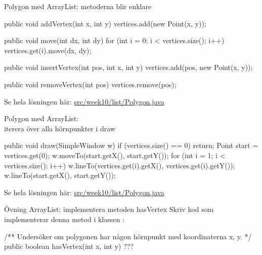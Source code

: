 \documentclass{lecturenotes}
\begin{document}
\begin{Slide}{Polygon med ArrayList: metoderna blir enklare}
\begin{Code}[numberstyle=]
    public void addVertex(int x, int y) {  
        vertices.add(new Point(x, y));
    }
    
    public void move(int dx, int dy) {
        for (int i = 0; i < vertices.size(); i++) {
        	vertices.get(i).move(dx, dy);
        }
    }
    
    public void insertVertex(int pos, int x, int y) {
    	vertices.add(pos, new Point(x, y));
    }
    
    public void removeVertex(int pos) {
    	vertices.remove(pos);
    }
\end{Code}

Se hela lösningen här:
\href{https://github.com/bjornregnell/lth-eda016-2015/blob/master/lectures/examples/eclipse-ws/lecture-examples/src/week10/list/Polygon.java}{src/week10/list/Polygon.java}
\end{Slide}

\begin{Slide}{Polygon med ArrayList: \\iterera över alla hörnpunkter i draw}
\begin{Code}[numberstyle=]
    public void draw(SimpleWindow w) {
        if (vertices.size() == 0) {
            return;
        }
        Point start = vertices.get(0);
        w.moveTo(start.getX(), start.getY());
        for (int i = 1; i < vertices.size(); i++) {
            w.lineTo(vertices.get(i).getX(), 
                     vertices.get(i).getY());
        }
        w.lineTo(start.getX(), start.getY());
    }
\end{Code}

Se hela lösningen här:
\href{https://github.com/bjornregnell/lth-eda016-2015/blob/master/lectures/examples/eclipse-ws/lecture-examples/src/week10/list/Polygon.java}{src/week10/list/Polygon.java}
\end{Slide}

\begin{Slide}{Övning ArrayList: implementera metoden hasVertex}
Skriv kod som implementerar denna metod i klassen :
\begin{Code}[numberstyle=]
/** Undersöker om polygonen har någon hörnpunkt med koordinaterna x, y. */ 
public boolean hasVertex(int x, int y) {
    ???
} 
\end{Code}
\end{Slide}
\end{document}

